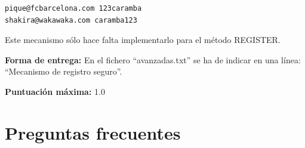 \documentclass[a4paper,11pt]{article}
\begin{document}
\begin{footnotesize}
\begin{verbatim}
pique@fcbarcelona.com 123caramba
shakira@wakawaka.com caramba123
\end{verbatim}
\end{footnotesize}


Este mecanismo sólo hace falta implementarlo para el método REGISTER.

  {\bf Forma de entrega:} En el fichero ``avanzadas.txt'' se ha de indicar en una línea: ``Mecanismo de registro seguro''.

  {\bf Puntuación máxima:} 1.0




\section{Preguntas frecuentes}
\end{document}
